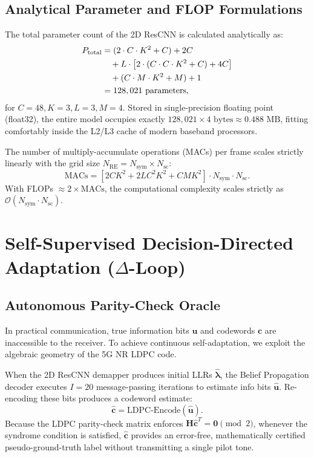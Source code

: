 \documentclass[journal]{IEEEtran}
\begin{document}
\subsection{Analytical Parameter and FLOP Formulations}
The total parameter count of the 2D ResCNN is calculated analytically as:
\begin{align}
    P_{\text{total}} &= (2 \cdot C \cdot K^2 + C) + 2C \notag \\
    &\quad + L \cdot \left[ 2 \cdot (C \cdot C \cdot K^2 + C) + 4C \right] \notag \\
    &\quad + (C \cdot M \cdot K^2 + M) + 1 \notag \\
    &= 128,021 \text{ parameters},
\end{align}
for $C=48, K=3, L=3, M=4$. Stored in single-precision floating point (float32), the entire model occupies exactly $128,021 \times 4\text{ bytes} \approx 0.488\text{ MB}$, fitting comfortably inside the L2/L3 cache of modern baseband processors.

The number of multiply-accumulate operations (MACs) per frame scales strictly linearly with the grid size $N_{\text{RE}} = N_{\text{sym}} \times N_{\text{sc}}$:
\begin{equation}
    \text{MACs} = \left[ 2CK^2 + 2L C^2 K^2 + CMK^2 \right] \cdot N_{\text{sym}} \cdot N_{\text{sc}}.
\end{equation}
With FLOPs $\approx 2 \times \text{MACs}$, the computational complexity scales strictly as $\mathcal{O}(N_{\text{sym}} \cdot N_{\text{sc}})$.

\section{Self-Supervised Decision-Directed Adaptation ($\Delta$-Loop)}
\label{sec:self_supervised}

\subsection{Autonomous Parity-Check Oracle}
In practical communication, true information bits $\mathbf{u}$ and codewords $\mathbf{c}$ are inaccessible to the receiver. To achieve continuous self-adaptation, we exploit the algebraic geometry of the 5G NR LDPC code. 

When the 2D ResCNN demapper produces initial LLRs $\hat{\boldsymbol{\lambda}}$, the Belief Propagation decoder executes $I = 20$ message-passing iterations to estimate info bits $\hat{\mathbf{u}}$. Re-encoding these bits produces a codeword estimate:
\begin{equation}
    \hat{\mathbf{c}} = \text{LDPC-Encode}(\hat{\mathbf{u}}).
\end{equation}
Because the LDPC parity-check matrix enforces $\mathbf{H} \hat{\mathbf{c}}^T = \mathbf{0} \pmod 2$, whenever the syndrome condition is satisfied, $\hat{\mathbf{c}}$ provides an error-free, mathematically certified pseudo-ground-truth label without transmitting a single pilot tone.
\end{document}
